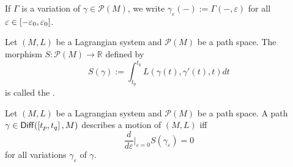 \begin{remark}
	If $\Gamma$ is a variation of $\gamma \in \mathcal{P}(M)$, we write $\gamma_\varepsilon(-) := \Gamma(-,\varepsilon)$ for all $\varepsilon \in \intcc[0]{-\varepsilon_0,\varepsilon_0}$.
\end{remark}

\begin{definition}
	Let $(M,L)$ be a Lagrangian system and $\mathcal{P}(M)$ be a path space. The morphism $S : \mathcal{P}(M) \to \mathbb{R}$ defined by
	\begin{equation*}
		S(\gamma) := \int_{t_p}^{t_q} L(\gamma(t),\gamma'(t),t) dt
	\end{equation*}
	\noindent is called the .
\end{definition}

\begin{axiom}
	Let $(M,L)$ be a Lagrangian system and $\mathcal{P}(M)$ be a path space. A path $\gamma \in \mathsf{Diff}(\intcc[0]{t_p,t_q},M)$ describes a motion of $(M,L)$ iff 
	\begin{equation}
		\frac{d}{d\varepsilon}\bigg\vert_{\varepsilon = 0} S(\gamma_\varepsilon) = 0
	\end{equation}
	\noindent for all variations $\gamma_\varepsilon$ of $\gamma$.
\end{axiom}
